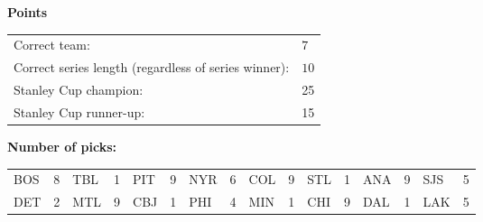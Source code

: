 \documentclass[10pt]{article}
\begin{document}
{\bf Points}\\
\begin{minipage}[t]{12cm}
    \vspace{0pt}
    \begin{tabular}{l l}
        Correct team:	& $7$\\
        Correct series length (regardless of series winner):	& $10$\\
        Stanley Cup champion:	& 25\\
        Stanley Cup runner-up:	& 15\\
    \end{tabular}

    \vspace{0.5cm}
    {\bf Number of picks:}\\
    \begin{tabular}{lc | lc | lc | lc | lc | lc | lc | lc }
        BOS & 8 & TBL & 1 & PIT & 9 & NYR & 6 & COL & 9 & STL & 1 & ANA & 9 & SJS & 5 \\
        DET & 2 & MTL & 9 & CBJ & 1 & PHI & 4 & MIN & 1 & CHI & 9 & DAL & 1 & LAK & 5 \\
    \end{tabular}
\end{minipage}
%
\end{document}
